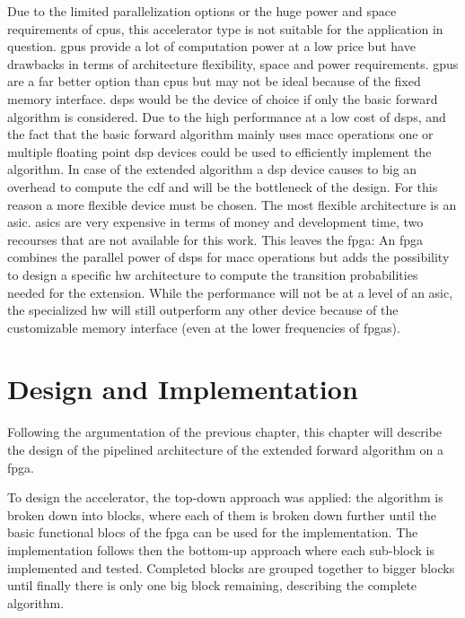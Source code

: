 \documentclass[mscthesis]{usiinfthesis}
\begin{document}
Due to the limited parallelization options or the huge power and space
requirements of \glspl{cpu}, this accelerator type is not suitable for the
application in question. \glspl{gpu} provide a lot of computation power at
a low price but have drawbacks in terms of architecture flexibility, space and
power requirements.  \glspl{gpu} are a far better option than \glspl{cpu} but
may not be ideal because of the fixed memory interface. \glspl{dsp} would be
the device of choice if only the basic forward algorithm is considered. Due to
the high performance at a low cost of \glspl{dsp}, and the fact that the basic
forward algorithm mainly uses \gls{macc} operations one or multiple
floating point \gls{dsp} devices could be used to efficiently implement the
algorithm. In case of the extended algorithm a \gls{dsp} device causes to big
an overhead to compute the \gls{cdf} and will be the bottleneck of the design.
For this reason a more flexible device must be chosen.  The most flexible
architecture is an \gls{asic}. \glspl{asic} are very expensive in terms of
money and development time, two recourses that are not available for this work.
This leaves the \gls{fpga}: An \gls{fpga} combines the parallel power of
\glspl{dsp} for \gls{macc} operations but adds the possibility to
design a specific \gls{hw} architecture to compute the transition probabilities
needed for the extension. While the performance will not be at a level of an
\gls{asic}, the specialized \gls{hw} will still outperform any other device
because of the customizable memory interface (even at the lower frequencies of
\glspl{fpga}).

\chapter{Design and Implementation}
\label{ch:design}
\glsresetall %

Following the argumentation of the previous chapter, this chapter will describe
the design of the pipelined architecture of the extended forward algorithm on
a \gls{fpga}.

To design the accelerator, the top-down approach was applied: the algorithm is
broken down into blocks, where each of them is broken down further until the
basic functional blocs of the \gls{fpga} can be used for the implementation. The
implementation follows then the bottom-up approach where each sub-block is
implemented and tested. Completed blocks are grouped together to bigger blocks
until finally there is only one big block remaining, describing the complete
algorithm.
\end{document}
